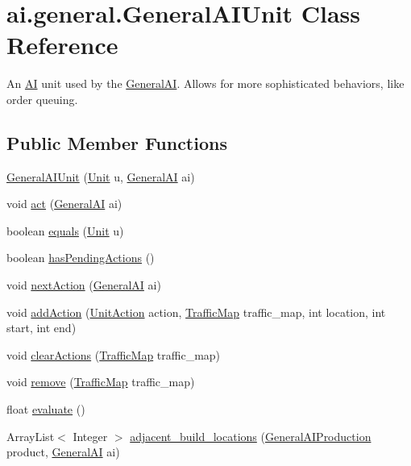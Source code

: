 \hypertarget{classai_1_1general_1_1_general_a_i_unit}{
\section{ai.general.GeneralAIUnit Class Reference}
\label{classai_1_1general_1_1_general_a_i_unit}
}


An \hyperlink{classai_1_1_a_i}{AI} unit used by the \hyperlink{classai_1_1general_1_1_general_a_i}{GeneralAI}. Allows for more sophisticated behaviors, like order queuing.  


\subsection*{Public Member Functions}
\begin{DoxyCompactItemize}
\item 
\hyperlink{classai_1_1general_1_1_general_a_i_unit_af8edb39c2f69a7bd2bacc80a48c57950}{GeneralAIUnit} (\hyperlink{classrts_1_1units_1_1_unit}{Unit} u, \hyperlink{classai_1_1general_1_1_general_a_i}{GeneralAI} ai)
\item 
void \hyperlink{classai_1_1general_1_1_general_a_i_unit_a4c6aeada6b83d8e2a725160bcc5ca0d3}{act} (\hyperlink{classai_1_1general_1_1_general_a_i}{GeneralAI} ai)
\item 
boolean \hyperlink{classai_1_1general_1_1_general_a_i_unit_a147bffe7148c2caa4bd5b1aef846ced7}{equals} (\hyperlink{classrts_1_1units_1_1_unit}{Unit} u)
\item 
boolean \hyperlink{classai_1_1general_1_1_general_a_i_unit_a15602445ff473ba52fbca9e19b05909f}{hasPendingActions} ()
\item 
void \hyperlink{classai_1_1general_1_1_general_a_i_unit_a3a1d1808e091e1d713752e5046c6abbc}{nextAction} (\hyperlink{classai_1_1general_1_1_general_a_i}{GeneralAI} ai)
\item 
void \hyperlink{classai_1_1general_1_1_general_a_i_unit_a6dfc068bd9f7cffb42fac8be8d570432}{addAction} (\hyperlink{classrts_1_1units_1_1_unit_action}{UnitAction} action, \hyperlink{classai_1_1general_1_1_traffic_map}{TrafficMap} traffic\_\-map, int location, int start, int end)
\item 
void \hyperlink{classai_1_1general_1_1_general_a_i_unit_ad70d53cdb07032c1f5356f0fe034f560}{clearActions} (\hyperlink{classai_1_1general_1_1_traffic_map}{TrafficMap} traffic\_\-map)
\item 
void \hyperlink{classai_1_1general_1_1_general_a_i_unit_aba187b9ebb1878e80dd69f85b91baa2f}{remove} (\hyperlink{classai_1_1general_1_1_traffic_map}{TrafficMap} traffic\_\-map)
\item 
float \hyperlink{classai_1_1general_1_1_general_a_i_unit_ac9325faea5b57306017ed2b09d6c0156}{evaluate} ()
\item 
ArrayList$<$ Integer $>$ \hyperlink{classai_1_1general_1_1_general_a_i_unit_aec2710c96a6b4347fc4423c43033a8e6}{adjacent\_\-build\_\-locations} (\hyperlink{classai_1_1general_1_1_general_a_i_production}{GeneralAIProduction} product, \hyperlink{classai_1_1general_1_1_general_a_i}{GeneralAI} ai)
\end{DoxyCompactItemize}
